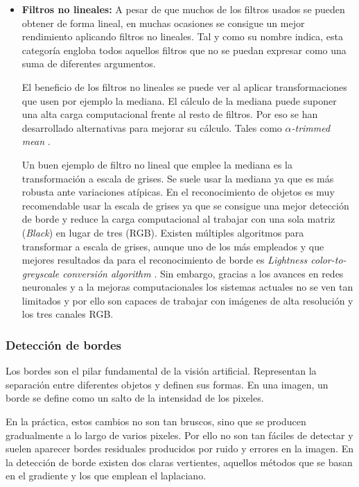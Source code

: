 \begin{itemize}
\item \textbf{Filtros no lineales:} A pesar de que muchos de los filtros usados se pueden obtener de forma lineal, en muchas ocasiones se consigue un mejor rendimiento aplicando filtros no lineales. Tal y como su nombre indica, esta categoría engloba todos aquellos filtros que no se puedan expresar como una suma de diferentes argumentos. 

El beneficio de los filtros no lineales se puede ver al aplicar transformaciones que usen por ejemplo la mediana. El cálculo de la mediana puede suponer una alta carga computacional frente al resto de filtros. Por eso se han desarrollado alternativas para mejorar su cálculo. Tales como \textit{$\alpha$-trimmed mean} \cite{alfa}.

Un buen ejemplo de filtro no lineal que emplee la mediana es la transformación a escala de grises. Se suele usar la mediana ya que es más robusta ante variaciones atípicas. En el reconocimiento de objetos es muy recomendable usar la escala de grises ya que se consigue una mejor detección de borde \cite{greyscale} y reduce la carga computacional al trabajar con una sola matriz (\textit{Black}) en lugar de tres (RGB). Existen múltiples algoritmos para transformar a escala de grises, aunque uno de los más empleados y que mejores resultados da para el reconocimiento de borde es \textit{Lightness color-to-greyscale conversión algorithm} \cite{greyscale}. Sin embargo, gracias a los avances en redes neuronales y a la mejoras computacionales los sistemas actuales no se ven tan limitados y por ello son capaces de trabajar con imágenes de alta resolución y los tres canales RGB.
\end{itemize}


\subsubsection*{Detección de bordes}
Los bordes son el pilar fundamental de la visión artificial. Representan la separación entre diferentes objetos y definen sus formas. En una imagen, un borde se define como un salto de la intensidad de los pixeles.

En la práctica, estos cambios no son tan bruscos, sino que se producen gradualmente a lo largo de varios pixeles. Por ello no son tan fáciles de detectar y suelen aparecer bordes residuales producidos por ruido y errores en la imagen. En la detección de borde existen dos claras vertientes, aquellos métodos que se basan en el gradiente y los que emplean el laplaciano.

